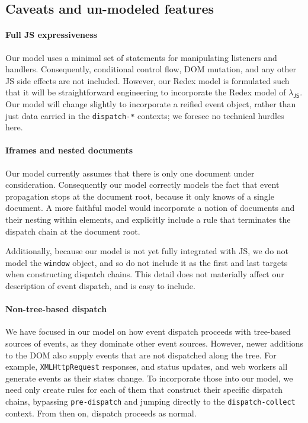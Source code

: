 \documentclass[letterpaper,10pt,twocolumn]{article}
\newcommand{\quot}{\mbox{\tt\char'042}}
\newcommand{\wild}{\mbox{\tt\char'137}}
\newcommand{\impl}[1]{{\def\_{\wild}\def\"{\quot}\tt#1}}
\DeclareRobustCommand{\spec}[1]{\textsf{#1}\xspace}
\DeclareRobustCommand\JS{\spec{JS}}
\DeclareRobustCommand{\LJS}{\ensuremath{\lambda_\JS}\xspace}
\begin{document}
\subsection{Caveats and un-modeled features}
\paragraph{Full \JS expressiveness}
Our model uses a minimal set of statements for manipulating listeners
and handlers.  Consequently, conditional control flow, DOM mutation,
and any other \JS side effects are not included.  However, our Redex
model is formulated such that it will be straightforward engineering
to incorporate the Redex model of \LJS.  Our model will change
slightly to incorporate a reified event object, rather than just data
carried in the \impl{dispatch-*} contexts; we foresee no technical
hurdles here.
\paragraph{Iframes and nested documents}
Our model currently assumes that there is only one document under
consideration.  Consequently our model correctly models the fact that
event propagation stops at the document root, because it only knows of
a single document.  A more faithful model would incorporate a notion
of documents and their nesting within  elements, and
explicitly include a rule that terminates the dispatch chain at the
document root.  

Additionally, because our model is not yet fully
integrated with \JS, we do not model the \impl{window} object, and so
do not include it as the first and last targets when constructing
dispatch chains.  This detail does not materially affect our
description of event dispatch, and is easy to include.
\paragraph{Non-tree-based dispatch} 
We have focused in our model on how event dispatch proceeds with
tree-based sources of events, as they dominate other event sources.
However, newer additions to the DOM also supply events that are not
dispatched along the tree.  For example, \impl{XMLHttpRequest}
responses,  and  status updates, and web
workers all generate events as their states change.  To incorporate
those into our model, we need only create rules for each of them that
construct their specific dispatch chains, bypassing
\impl{pre-dispatch} and jumping directly to the
\impl{dispatch-collect} context.  From then on, dispatch proceeds as
normal.
\end{document}
